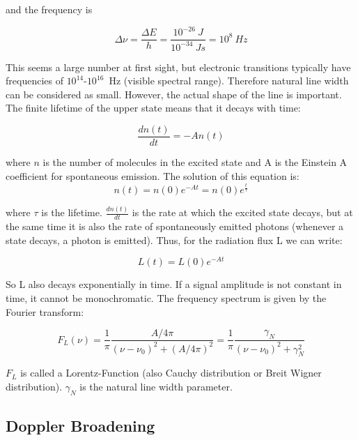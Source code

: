 \documentclass[a4paper,fleqn]{article}
\begin{document}
and the frequency is

\begin{equation}
\Delta \nu = \frac{\Delta E}{h} = \frac{10^{-26}~J}{10^{-34}~Js} = 10^{8}~Hz
\end{equation}

This seems a large number at first sight, but electronic transitions typically have frequencies of $10^{14}$-$10^{16}$~Hz (visible spectral range). 
Therefore natural line width can be considered as small. However, the actual shape of the line is important.  \\

The finite lifetime of the upper state means that it decays with time:
 
\begin{equation}
\frac{dn(t)}{dt} = -A n(t)
\end{equation}

where $n$ is the number of molecules in the excited state and A is the Einstein A coefficient for spontaneous emission. The solution of this equation is:
\begin{equation}
n(t) = n(0) e^{-At} = n(0) e^{\frac{t}{\tau}}
\end{equation}

where $\tau$ is the lifetime. $\frac{dn(t)}{dt}$ is the rate at which the excited state decays, but at the same time it is also the rate of spontaneously emitted photons (whenever a state decays, a photon is emitted). Thus, for the radiation flux L we can write: 

\begin{equation}
L(t) = L(0) e^{-At} 
\end{equation}

So L also decays exponentially in time. If a signal amplitude is not constant in time, it cannot be monochromatic. The frequency spectrum is given by the Fourier transform: 

\begin{equation}
F_{L}(\nu) = \frac{1}{\pi} \frac{A/4\pi}{(\nu - \nu_{0})^{2} + (A/4\pi)^{2}} = \frac{1}{\pi} \frac{\gamma_{N}}{(\nu - \nu_{0})^{2} + \gamma_{N}^{2}} 
\end{equation}

$F_{L}$ is called a Lorentz-Function (also Cauchy distribution or Breit Wigner distribution). $\gamma_{N}$ is the natural line width parameter. 

\subsection{Doppler Broadening}
\end{document}

